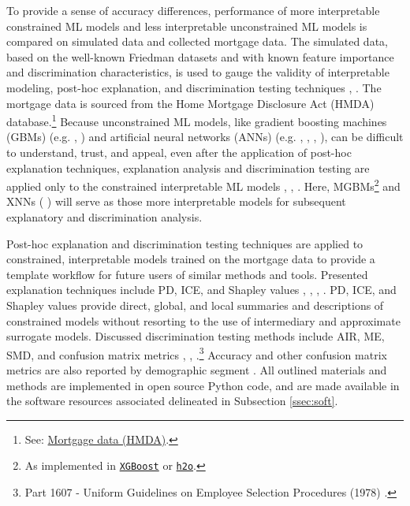 \documentclass[information,article,submit,moreauthors,pdftex]{definitions/mdpi}
\begin{document}
To provide a sense of accuracy differences, performance of more interpretable constrained ML models and less interpretable unconstrained ML models is compared on simulated data and collected mortgage data. The simulated data, based on the well-known Friedman datasets and with known feature importance and discrimination characteristics, is used to gauge the validity of interpretable modeling, post-hoc explanation, and discrimination testing techniques \cite{friedman1979tree}, \cite{friedman1991multivariate}. The mortgage data is sourced from the Home Mortgage Disclosure Act (HMDA) database.\footnote{See: \href{https://www.consumerfinance.gov/data-research/hmda/}{Mortgage data (HMDA)}.} Because unconstrained ML models, like gradient boosting machines (GBMs) (e.g. \cite{friedman2001greedy}, \cite{esl}) and artificial neural networks (ANNs) (e.g. \cite{recht2011hogwild}, \cite{hinton2012improving}, \cite{sutskever2013importance}, \cite{zeiler2012adadelta}), can be difficult to understand, trust, and appeal, even after the application of post-hoc explanation techniques, explanation analysis and discrimination testing are applied only to the constrained interpretable ML models \cite{please_stop}, \cite{fair_washing}, \cite{scaffolding}. Here, MGBMs\footnote{As implemented in \href{https://xgboost.readthedocs.io/en/latest/tutorials/monotonic.html}{\texttt{XGBoost}} or \href{https://github.com/h2oai/h2o-3/blob/master/h2o-py/demos/H2O_tutorial_gbm_monotonicity.ipynb}{\texttt{h2o}}.} and XNNs (\cite{wf_xnn} \cite{yang2019enhancing}) will serve as those more interpretable models for subsequent explanatory and discrimination analysis.

Post-hoc explanation and discrimination testing techniques are applied to constrained, interpretable models trained on the mortgage data to provide a template workflow for future users of similar methods and tools. Presented explanation techniques include PD, ICE, and Shapley values \cite{esl}, \cite{ice_plots}, \cite{shapley}, \cite{tree_shap}. PD, ICE, and Shapley values provide direct, global, and local summaries and descriptions of constrained models without resorting to the use of intermediary and approximate surrogate models. Discussed discrimination testing methods include AIR, ME, SMD, and confusion matrix metrics \cite{feldman2015certifying}, \cite{cohen1988statistical}, \cite{cohen1992power}.\footnote{Part 1607 - Uniform Guidelines on Employee Selection Procedures (1978) .} Accuracy and other confusion matrix metrics are also reported by demographic segment \cite{zafar2017fairness}. All outlined materials and methods are implemented in open source Python code, and are made available in the software resources associated delineated in Subsection \ref{ssec:soft}.  
\end{document}
